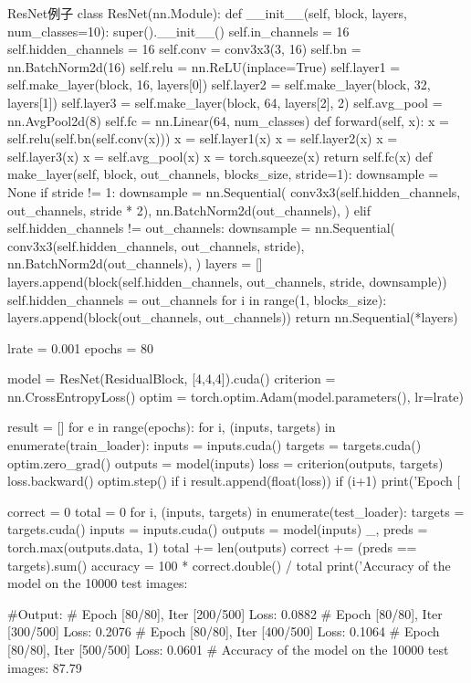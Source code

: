 \documentclass[openbib]{article}
\begin{document}
\begin{Python}{ResNet例子}
	class ResNet(nn.Module):
	def __init__(self, block, layers, num_classes=10):
	super().__init__()
	self.in_channels = 16
	self.hidden_channels = 16
	self.conv = conv3x3(3, 16)
	self.bn = nn.BatchNorm2d(16)
	self.relu = nn.ReLU(inplace=True)
	self.layer1 = self.make_layer(block, 16, layers[0])
	self.layer2 = self.make_layer(block, 32, layers[1])
	self.layer3 = self.make_layer(block, 64, layers[2], 2)
	self.avg_pool = nn.AvgPool2d(8)
	self.fc = nn.Linear(64, num_classes)
	def forward(self, x):
	x = self.relu(self.bn(self.conv(x)))
	x = self.layer1(x)
	x = self.layer2(x)
	x = self.layer3(x)
	x = self.avg_pool(x)
	x = torch.squeeze(x)
	return self.fc(x)
	def make_layer(self, block, out_channels, blocks_size, stride=1):
	downsample = None
	if stride != 1:
	downsample = nn.Sequential(
	conv3x3(self.hidden_channels, out_channels, stride * 2),
	nn.BatchNorm2d(out_channels),
	)
	elif self.hidden_channels != out_channels:
	downsample = nn.Sequential(
	conv3x3(self.hidden_channels, out_channels, stride),
	nn.BatchNorm2d(out_channels),
	)
	layers = []
	layers.append(block(self.hidden_channels, out_channels, stride, downsample))
	self.hidden_channels = out_channels
	for i in range(1, blocks_size):
	layers.append(block(out_channels, out_channels))
	return nn.Sequential(*layers)
	
	lrate = 0.001
	epochs = 80
	
	model = ResNet(ResidualBlock, [4,4,4]).cuda()
	criterion = nn.CrossEntropyLoss()
	optim = torch.optim.Adam(model.parameters(), lr=lrate)
	
	result = []
	for e in range(epochs):
	for i, (inputs, targets) in enumerate(train_loader):
	inputs = inputs.cuda()
	targets = targets.cuda()
	optim.zero_grad()
	outputs = model(inputs)
	loss = criterion(outputs, targets)
	loss.backward()
	optim.step()
	if i %
	result.append(float(loss))
	if (i+1) %
	print('Epoch [%
	
	correct = 0
	total = 0
	for i, (inputs, targets) in enumerate(test_loader):
	targets = targets.cuda()
	inputs = inputs.cuda()
	outputs = model(inputs)
	_, preds = torch.max(outputs.data, 1)
	total += len(outputs)
	correct += (preds == targets).sum()
	accuracy = 100 * correct.double() / total
	print('Accuracy of the model on the 10000 test images: %
	
	#Output:
	#		Epoch [80/80], Iter [200/500] Loss: 0.0882
	#		Epoch [80/80], Iter [300/500] Loss: 0.2076
	#		Epoch [80/80], Iter [400/500] Loss: 0.1064
	#		Epoch [80/80], Iter [500/500] Loss: 0.0601
	#		Accuracy of the model on the 10000 test images: 87.79 %
\end{Python}
\end{document}
